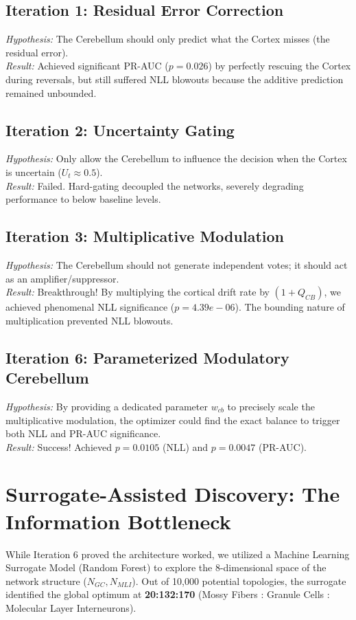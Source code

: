 \documentclass[11pt,a4paper]{article}
\begin{document}
\subsection{Iteration 1: Residual Error Correction}
\textit{Hypothesis:} The Cerebellum should only predict what the Cortex misses (the residual error). \\
\textit{Result:} Achieved significant PR-AUC ($p=0.026$) by perfectly rescuing the Cortex during reversals, but still suffered NLL blowouts because the additive prediction remained unbounded.
\subsection{Iteration 2: Uncertainty Gating}
\textit{Hypothesis:} Only allow the Cerebellum to influence the decision when the Cortex is uncertain ($U_t \approx 0.5$). \\
\textit{Result:} Failed. Hard-gating decoupled the networks, severely degrading performance to below baseline levels.
\subsection{Iteration 3: Multiplicative Modulation}
\textit{Hypothesis:} The Cerebellum should not generate independent votes; it should act as an amplifier/suppressor. \\
\textit{Result:} Breakthrough! By multiplying the cortical drift rate by $(1 + Q_{CB})$, we achieved phenomenal NLL significance ($p=4.39e-06$). The bounding nature of multiplication prevented NLL blowouts.
\subsection{Iteration 6: Parameterized Modulatory Cerebellum}
\textit{Hypothesis:} By providing a dedicated parameter $w_{cb}$ to precisely scale the multiplicative modulation, the optimizer could find the exact balance to trigger both NLL and PR-AUC significance. \\
\textit{Result:} Success! Achieved $p=0.0105$ (NLL) and $p=0.0047$ (PR-AUC).

\section{Surrogate-Assisted Discovery: The Information Bottleneck}
While Iteration 6 proved the architecture worked, we utilized a Machine Learning Surrogate Model (Random Forest) to explore the 8-dimensional space of the network structure ($N_{GC}, N_{MLI}$). Out of 10,000 potential topologies, the surrogate identified the global optimum at \textbf{20:132:170} (Mossy Fibers : Granule Cells : Molecular Layer Interneurons).
\end{document}

